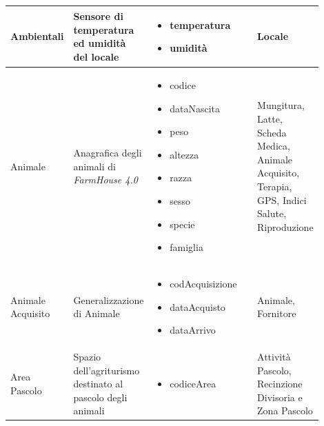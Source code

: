 \documentclass[12pt,a4paper]{article}
\begin{document}
\begin{center}
\begin{longtable}{|p{0.14\linewidth}|p{0.20\linewidth}|p{0.36\linewidth}|p{0.20\linewidth}|}
\hline
Ambientali 			&  Sensore di temperatura ed umidità del locale  
					& \begin{itemize}
						\setlength{\itemindent}{-1em}
						\vspace{-25pt}
						\setlength\itemsep{-0.25em}
						\item temperatura
						\item umidità
					\end{itemize}
					&  Locale \\

\hline
Animale 				&  Anagrafica degli animali di \textit{FarmHouse 4.0} 
					& \begin{itemize}
						\setlength{\itemindent}{-1em}
						\vspace{-25pt}
						\setlength\itemsep{-0.25em}
						\item codice
						\item dataNascita
						\item peso
						\item altezza
						\item razza
						\item sesso
						\item specie
						\item famiglia
						
					\end{itemize}
					&  Mungitura, Latte, Scheda Medica, Animale Acquisito, Terapia, GPS, Indici Salute, Riproduzione \\ 

\hline
Animale Acquisito 	& Generalizzazio\-ne di Animale 
					& \begin{itemize}
						\setlength{\itemindent}{-1em}
						\vspace{-25pt}
						\setlength\itemsep{-0.25em}
						\item codAcquisizione
						\item dataAcquisto
						\item dataArrivo
						
					\end{itemize}
					&  Animale, Fornitore  \\ 

\hline
Area Pa\-sco\-lo 		&  Spazio dell'agriturismo destinato al pascolo degli animali 
					& \begin{itemize}
						\setlength{\itemindent}{-1em}
						\vspace{-25pt}
						\setlength\itemsep{-0.25em}
						\item codiceArea
					\end{itemize}
					&  Attività Pascolo, Recinzione Divisoria e Zona Pascolo \\


\end{longtable}
\end{center}
\end{document}
